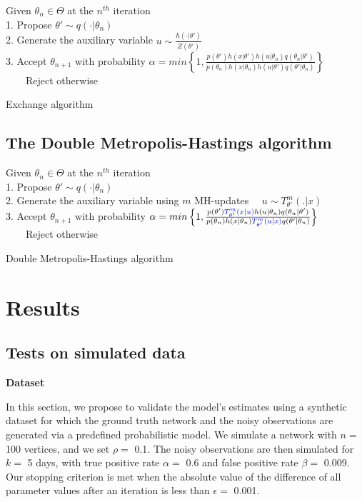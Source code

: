 \documentclass[]{article}
\begin{document}
\begin{algorithm}[H]
 Given $\theta_n \in \Theta$ at the $n^{th}$ iteration \\
 1. Propose $\theta' \sim q(\cdot|\theta_n)$ \\ 
 2. Generate the auxiliary variable $u \sim \frac{h(\cdot|\theta')}{Z(\theta')}$ \\ 
 3. Accept $\theta_{n+1}$ with probability $\alpha = min\left\{1, \frac{p(\theta')h(x|\theta')h(u|\theta_n)q(\theta_n|\theta')}{p(\theta_n)h(x|\theta_n)h(u|\theta')q(\theta'|\theta_n)}\right\}$\\
 ~~~~Reject otherwise
 \caption{Exchange algorithm}
\end{algorithm}

\hypertarget{the-double-metropolis-hastings-algorithm}{%
\subsection{The Double Metropolis-Hastings
algorithm}\label{the-double-metropolis-hastings-algorithm}}

\begin{algorithm}[H]
 Given $\theta_n \in \Theta$ at the $n^{th}$ iteration \\
 1. Propose $\theta' \sim q(\cdot|\theta_n)$ \\ 
 2. Generate the auxiliary variable using $m$ MH-updates 
 ~~$u \sim T^m_{\theta'}(.|x)$ \\ 
3. Accept $\theta_{n+1}$ with probability $\alpha = min\left\{1, \frac{p(\theta'){\color{blue}T^m_{\theta'}(x|u)}h(u|\theta_n)q(\theta_n|\theta')}{p(\theta_n)h(x|\theta_n){\color{blue}T^m_{\theta'}(u|x)}q(\theta'|\theta_n)}\right\}$\\
 ~~~~Reject otherwise 
 \caption{Double Metropolis-Hastings algorithm}
\end{algorithm}

\hypertarget{results}{%
\section{Results}\label{results}}

\hypertarget{tests-on-simulated-data}{%
\subsection{Tests on simulated data}\label{tests-on-simulated-data}}

\textbf{Dataset}

In this section, we propose to validate the model's estimates using a
synthetic dataset for which the ground truth network and the noisy
observations are generated via a predefined probabilistic model. We
simulate a network with \(n=\) 100 vertices, and we set \(\rho=\) 0.1.
The noisy observations are then simulated for \(k=\) 5 days, with true
positive rate \(\alpha=\) 0.6 and false positive rate \(\beta=\) 0.009.
Our stopping criterion is met when the absolute value of the difference
of all parameter values after an iteration is less than \(\epsilon=\)
0.001.
\end{document}
